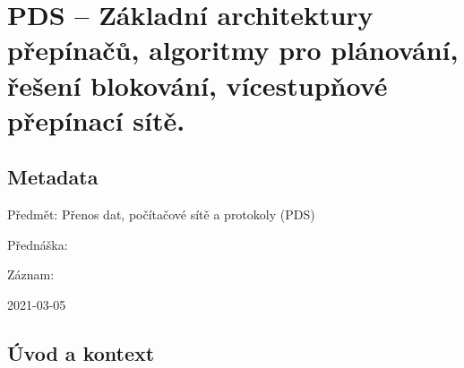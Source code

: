 

\graphicspath{{pds/architektura_prepinacu}}


\chapter{PDS -- Základní architektury přepínačů, algoritmy pro plánování, řešení blokování, vícestupňové
přepínací sítě.}


\section{Metadata}

\begin{compactitem}
    \item Předmět: Přenos dat, počítačové sítě a protokoly (PDS)
    \item Přednáška:
    \begin{compactitem}
        \item {}
    \end{compactitem}
    \item Záznam:
    \begin{compactitem}
        \item 2021-03-05
    \end{compactitem}
\end{compactitem}


\section{Úvod a kontext}

